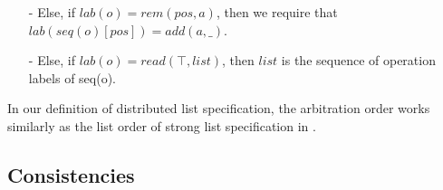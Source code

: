 \begin{itemize}
\begin{itemize}
    \item[-] Else, if $lab(o)=rem(pos,a)$, then we require that $lab(seq(o)[pos]) = add(a,\_)$. 
    
    \item[-] Else, if $lab(o)=read(\top,list)$, then $list$ is the sequence of operation labels of seq(o). 
    \end{itemize}


\end{itemize} 


In our definition of distributed list specification, the arbitration order works similarly as the list order of strong list specification in \cite{Attiya:2016}.





\subsection{Consistencies}
\label{subsec:consistencies}

